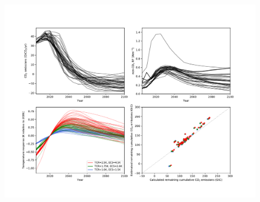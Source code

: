 \documentclass[11pt]{article}
\begin{document}
\begin{figure}[h]
\begin{centering}
    \includegraphics[scale=0.6]{figures/all_scens_tcr_ecs_range.pdf}
    \caption{}
    \label{}
\end{centering}
\end{figure}
\end{document}
